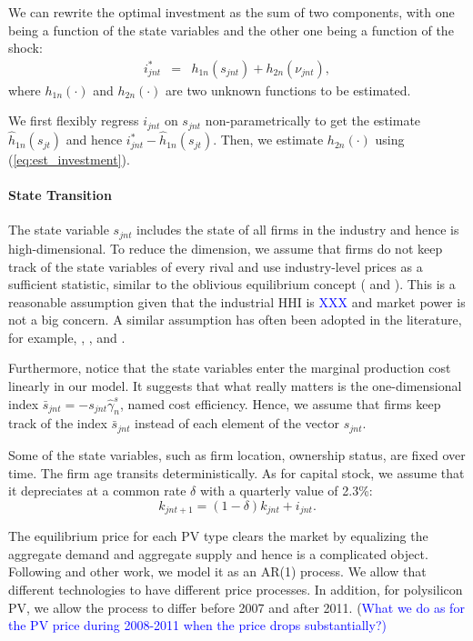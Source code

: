 \documentclass[12pt]{article}
\begin{document}
We can rewrite the optimal investment as the sum of two components, with one being a function of the state variables and the other one being a function of the shock:
\begin{eqnarray}
i_{jnt}^* &=& h_{1n}(s_{jnt})+h_{2n}(\nu_{jnt}),
\end{eqnarray}
where $h_{1n}(\cdot)$ and $h_{2n}(\cdot)$ are two unknown functions to be estimated.

We first flexibly regress $i_{jnt}$ on $s_{jnt}$ non-parametrically to get the estimate $\hat{h}_{1n}(s_{jt})$ and hence $i^*_{jnt}-\hat{h}_{1n}(s_{jt})$. Then, we estimate $h_{2n}(\cdot)$ using (\ref{eq:est_investment}).


\paragraph{State Transition}
The state variable $s_{jnt}$ includes the state of all firms in the industry and hence is high-dimensional. To reduce the dimension, we assume that firms do not keep track of the state variables of every rival and use industry-level prices as a sufficient statistic, similar to the oblivious equilibrium concept  (\citet{weintraub2008markov} and \citet{benkard2015oblivious}). This is a reasonable assumption given that the industrial HHI is \textcolor{blue}{XXX} and market power is not a big concern. A similar assumption has often been adopted in the literature, for example, \citet{jeon2022learning}, \citet{chen2023structural}, and \citet{barwick2025industrial}.

Furthermore, notice that the state variables enter the marginal production cost linearly in our model. It suggests that what really matters is the one-dimensional index $\bar s_{jnt} = -s_{jnt} \hat \gamma_n^s$, named cost efficiency. Hence, we assume that firms keep track of the index $\bar s_{jnt}$ instead of each element of the vector $s_{jnt}$.

Some of the state variables, such as firm location, ownership status, are fixed over time. The firm age transits deterministically. As for capital stock, we assume that it depreciates at a common rate $\delta$ with a quarterly value of 2.3\%:
\[
k_{jnt+1}  = (1-\delta) k_{jnt} + i_{jnt}.
\]

The equilibrium price for each PV type clears the market by equalizing the aggregate demand and aggregate supply and hence is a complicated object. Following \citet{barwick2025industrial} and other work, we model it as an AR(1) process. We allow that different technologies to have different price processes. In addition, for polysilicon PV, we allow the process to differ before 2007 and after 2011.
(\textcolor{blue}{What we do as for the PV price during 2008-2011 when the price drops substantially?)}
\end{document}
